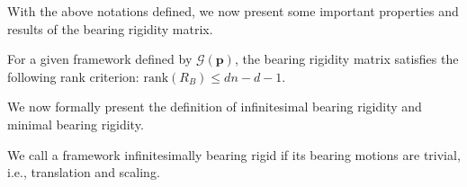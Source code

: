 
With the above notations defined, we now present some important properties and results of the bearing rigidity matrix.
\begin{lemma}
For a given framework defined by $\mathcal{G}(\mathbf{p})$, the bearing rigidity matrix satisfies the following rank criterion: $\text{rank}(R_B) \leq dn-d-1$.
\end{lemma}

We now formally present the definition of infinitesimal bearing rigidity and minimal bearing rigidity.
\begin{definition}
We call a framework infinitesimally bearing rigid if its bearing motions are trivial, i.e., translation and scaling.
\end{definition}

